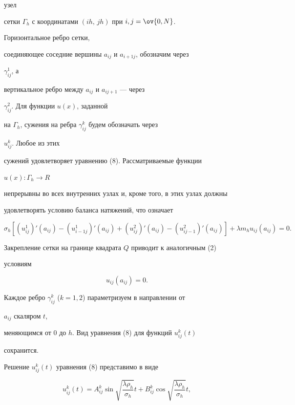 узел 


сетки $\Gamma_h$ с координатами $(ih,\,jh)$ при $i,j=\ov{0,N}$. 


Горизонтальное ребро сетки, 


соединяющее соседние вершины $a_{ij}$ и $a_{i+1j}$, обозначим через 


$\gamma^1_{ij}$, а 


вертикальное ребро между $a_{ij}$ и $a_{i j+1}$ --- через 


$\gamma^2_{ij}$. Для функции $u(x)$, заданной 


на $\Gamma_h$, сужения на ребра $\gamma^k_{ij}$ будем обозначать через 


$u^k_{ij}$. Любое из этих 


сужений удовлетворяет уравнению (8). Рассматриваемые функции 


$u(x):\Gamma_h\to R$ 


непрерывны во всех внутренних узлах и, кроме того, в этих узлах должны 


удовлетворять условию баланса натяжений, что означает 


\begin{equation} 


\sigma_h[(u^1_{ij})'(a_{ij})-(u^1_{i-1j})'(a_{ij})+ 


(u^2_{ij})'(a_{ij})-(u^2_{i j-1})'(a_{ij})]+ 


\lambda m_h u_{ij}(a_{ij})=0. 


\end{equation} 


Закрепление сетки на границе квадрата $Q$ приводит к аналогичным (2) 


условиям 


\begin{equation} 


u_{ij}(a_{ij})=0. 


\end{equation} 


Каждое ребро $\gamma^k_{ij}$ ($k=1,2$) параметризуем в направлении от 


$a_{ij}$ скаляром $t$, 


меняющимся от $0$ до $h$. Вид уравнения (8) для функций $u^k_{ij}(t)$ 


сохранится. 


 


Решение $u^k_{ij}(t)$ уравнения (8) представимо в виде 


\begin{equation} 


u^k_{ij}(t)=A^k_{ij}\sin 


\sqrt{\frac{\lambda\rho_h}{\sigma_h}}t+B^k_{ij}\cos 


\sqrt{\frac{\lambda\rho_h}{\sigma_h}}t, 


\end{equation} 



